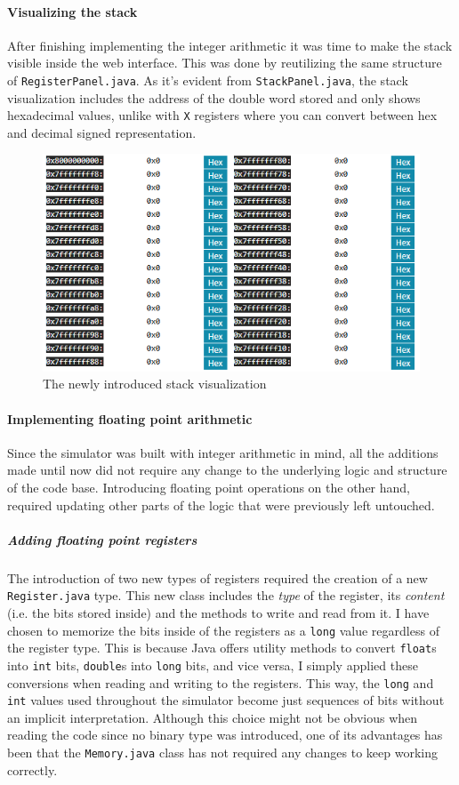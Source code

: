 \paragraph*{Visualizing the stack}

After finishing implementing the integer arithmetic it was time to make the stack visible inside the web interface. This was done by reutilizing the same structure of \verb|RegisterPanel.java|. As it's evident from \verb|StackPanel.java|, the stack visualization includes the address of the double word stored and only shows hexadecimal values, unlike with \verb|X| registers where you can convert between hex and decimal signed representation.

\begin{figure}[H]
	\centering
	\includegraphics[width=.8\textwidth]{img/stack_vis.png}
	\caption{The newly introduced stack visualization}
\end{figure}

\paragraph*{Implementing floating point arithmetic}

Since the simulator was built with integer arithmetic in mind, all the additions made until now did not require any change to the underlying logic and structure of the code base. Introducing floating point operations on the other hand, required updating other parts of the logic that were previously left untouched.

\subparagraph*{Adding floating point registers}

The introduction of two new types of registers required the creation of a new \verb|Register.java| type. This new class includes the \emph{type} of the register, its \emph{content} (i.e. the bits stored inside) and the methods to write and read from it. I have chosen to memorize the bits inside of the registers as a \verb|long| value regardless of the register type. This is because Java offers utility methods to convert \verb|float|s into \verb|int| bits, \verb|double|s into \verb|long| bits, and vice versa, I simply applied these conversions when reading and writing to the registers. This way, the \verb|long| and \verb|int| values used throughout the simulator become just sequences of bits without an implicit interpretation. Although this choice might not be obvious when reading the code since no binary type was introduced, one of its advantages has been that the \verb|Memory.java| class has not required any changes to keep working correctly.

